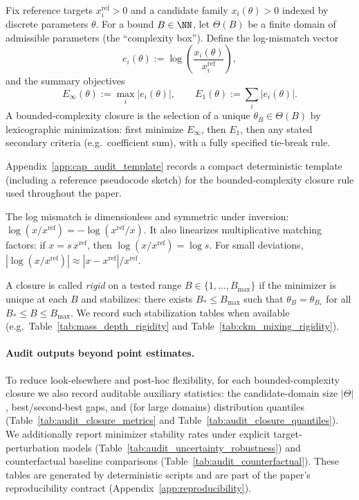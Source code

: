 \begin{definition}\label{def:bounded_complexity_closure}
Fix reference targets $x_i^{\mathrm{ref}}>0$ and a candidate family $x_i(\theta)>0$ indexed by discrete parameters $\theta$.
For a bound $B\in\NN$, let $\Theta(B)$ be a finite domain of admissible parameters (the ``complexity box'').
Define the log-mismatch vector
\[
e_i(\theta):=\log\!\left(\frac{x_i(\theta)}{x_i^{\mathrm{ref}}}\right),
\]
and the summary objectives
\[
E_\infty(\theta):=\max_i |e_i(\theta)|,\qquad E_1(\theta):=\sum_i |e_i(\theta)|.
\]
A bounded-complexity closure is the selection of a unique $\theta_B\in\Theta(B)$ by lexicographic minimization:
first minimize $E_\infty$, then $E_1$, then any stated secondary criteria (e.g.\ coefficient sum), with a fully specified tie-break rule.
\end{definition}
\begin{remark}\label{rem:cap_audit_template_pointer}
Appendix~\ref{app:cap_audit_template} records a compact deterministic template (including a reference pseudocode sketch) for the bounded-complexity closure rule used throughout the paper.
\end{remark}
\begin{remark}\label{rem:log_mismatch}
The log mismatch is dimensionless and symmetric under inversion: $\log(x/x^{\mathrm{ref}})=-\log(x^{\mathrm{ref}}/x)$.
It also linearizes multiplicative matching factors: if $x=s\,x^{\mathrm{ref}}$, then $\log(x/x^{\mathrm{ref}})=\log s$.
For small deviations, $|\log(x/x^{\mathrm{ref}})|\approx |x-x^{\mathrm{ref}}|/x^{\mathrm{ref}}$.
\end{remark}

\begin{definition}\label{def:rigidity_certificate}
A closure is called \emph{rigid} on a tested range $B\in\{1,\dots,B_{\max}\}$ if the minimizer is unique at each $B$ and stabilizes:
there exists $B_\ast\le B_{\max}$ such that $\theta_B=\theta_{B_\ast}$ for all $B_\ast\le B\le B_{\max}$.
We record such stabilization tables when available (e.g.\ Table~\ref{tab:mass_depth_rigidity} and Table~\ref{tab:ckm_mixing_rigidity}).
\end{definition}

\paragraph{Audit outputs beyond point estimates.}
To reduce look-elsewhere and post-hoc flexibility, for each bounded-complexity closure we also record auditable auxiliary statistics:
the candidate-domain size $|\Theta|$, best/second-best gaps, and (for large domains) distribution quantiles (Table~\ref{tab:audit_closure_metrics} and Table~\ref{tab:audit_closure_quantiles}).
We additionally report minimizer stability rates under explicit target-perturbation models (Table~\ref{tab:audit_uncertainty_robustness}) and counterfactual baseline comparisons (Table~\ref{tab:audit_counterfactual}).
These tables are generated by deterministic scripts and are part of the paper's reproducibility contract (Appendix~\ref{app:reproducibility}).

